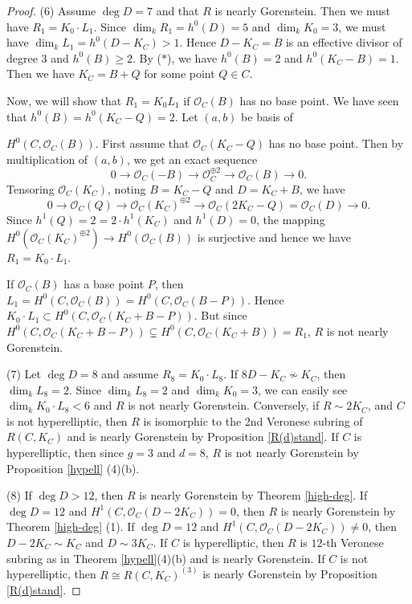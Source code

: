 \documentclass[12pt]{amsart}
\theoremstyle{definition}
\theoremstyle{remark}
\numberwithin{equation}{section}
\newcommand{\cO}{\mathcal O}
\renewcommand{\:}{\colon}
\begin{document}
\begin{proof}
\par \vspace{1mm}
(6) 
Assume $\deg D =7$ and that $R$ is nearly Gorenstein. 
Then we must have  $R_1 = K_0\cdot L_1$. 
Since  $\dim_k R_1 = h^0(D)= 5$ and  $\dim_k K_0=3$, 
we must have $\dim_k L_1=h^0(D-K_C)>1$. 
Hence $D-K_C=B$ is an effective divisor of degree $3$ and 
$h^0(B)\ge 2$. 
By ($*$), we have $h^0(B) = 2$ and $h^0(K_C - B)=1$. 
Then we have $K_C = B+Q$ for some point $Q\in C$.  
\par \vspace{1mm}
Now, we will show that $R_1= K_0L_1$ if $\cO_C(B)$ has no base point.  
We have seen that $h^0(B)= h^0( K_C - Q)=2$. 
Let $(a,b)$ be basis of \par\noindent
$H^0(C,\cO_C(B))$. 
First assume that $\cO_C(K_C-Q)$ has no base point. 
Then by multiplication of $(a, b)$, 
we get an exact sequence 
\[
0 \to \cO_C(-B)\to \cO_C^{\oplus 2} \to \cO_C(B)\to 0.
\]
Tensoring $\cO_C(K_C)$, noting $B = K_C-Q$ and $D=K_C+B$, we have      
\[
0 \to \cO_C(Q) \to \cO_C(K_C)^{\oplus 2} \to \cO_C(2K_C - Q)= \cO_C(D) \to 0.
\] 
Since  $h^1(Q) = 2 =  2 \cdot h^1(K_C)$ and $h^1(D)=0$, 
the mapping $H^0(\cO_C(K_C)^{\oplus 2}) \to H^0(\cO_C(B))$ is surjective and hence 
we have $R_1 = K_0 \cdot L_1$. 
\par 
If $\cO_C(B)$ has a base point $P$, then $L_1 = H^0(C,\cO_C(B)) = H^0(C,\cO_C(B-P))$. 
Hence $K_0\cdot L_1 \subset H^0(C,\cO_C(K_C + B - P))$. But since 
$H^0(C,\cO_C(K_C + B - P))\subsetneq  H^0(C,\cO_C(K_C + B))=R_1$, $R$ is not nearly Gorenstein. 

\par \vspace{1mm}
(7) Let $\deg D=8$ and assume $R_8 = K_0\cdot L_8$. If $8D - K_C \not\sim K_C$, 
then $\dim_k L_8=2$. Since $\dim_k L_8=2$ and $\dim_k K_0 =3$, we can easily see 
$\dim_k K_0\cdot L_8 < 6$ and $R$ is not nearly Gorenstein. Conversely, if $R\sim 2K_C$, 
and $C$ is not hyperelliptic, then $R$ is isomorphic to the 2nd Veronese subring of 
$R(C,K_C)$ and is nearly Gorenstein by Proposition \ref{R(d)stand}. 
If $C$ is hyperelliptic, 
then since $g=3$ and $d=8$, $R$ is not nearly Gorenstein 
by Proposition \ref{hypell} (4)(b).   
\par \vspace{1mm} 
(8) If $\deg D>12$, then $R$ is nearly Gorenstein by Theorem 
\ref{high-deg}. 
If $\deg D= 12$ and $H^1(C,\cO_C(D-2K_C))= 0$, then $R$ is nearly Gorenstein 
by Theorem \ref{high-deg} (1).  
If $\deg D= 12$ and $H^1(C,\cO_C(D-2K_C))\ne 0$, then 
$D-2K_C\sim K_C$ and 
$D\sim 3K_C$. 
If $C$ is hyperelliptic, then $R$ is $12$-th Veronese subring as in 
Theorem \ref{hypell}(4)(b) and is nearly Gorenstein. 
If $C$ is not hyperelliptic, 
then $R\cong R(C,K_C)^{(3)}$ is nearly Gorenstein 
by Proposition \ref{R(d)stand}.      
\end{proof} 
\end{document}
